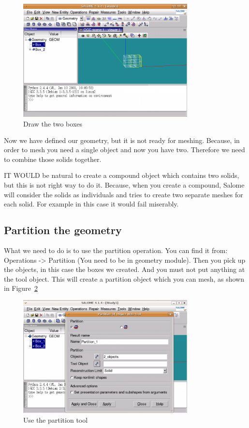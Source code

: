\begin{figure}[H]
\centering
\includegraphics[width=0.8\textwidth]{Salome-1-twoboxes}
\caption{Draw the two boxes}\label{fg:salome-1}
\end{figure}

Now we have defined our geometry, but it is not ready for meshing. Because, in order to mesh you need a single object and now you have two. Therefore we need to combine those solids together.

IT WOULD be natural to create a compound object which contains two solids, but this is not right way to do it. Because, when you create a compound, Salome will consider the solids as individuals and tries to create two separate meshes for each solid. For example in this case it would fail miserably.

\subsection{Partition the geometry}

What we need to do is to use the partition operation. You can find it from: Operations -> Partition (You need to be in geometry module). Then you pick up the objects, in this case the boxes we created. And you must not put anything at the tool object. This will create a partition object which you can mesh, as shown in Figure~\ref{fg:salome-2}

\begin{figure}[H]
\centering
\includegraphics[width=0.8\textwidth]{Salome-2-partition}
\caption{Use the partition tool}\label{fg:salome-2}
\end{figure}

